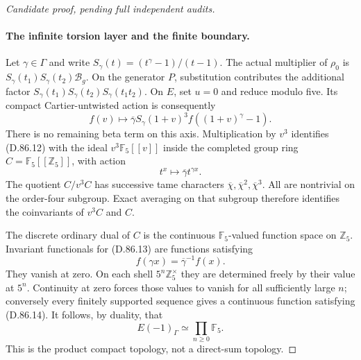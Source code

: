 \begin{proof}[Candidate proof, pending full independent audits]
\paragraph{The infinite torsion layer and the finite boundary.}
Let \(\gamma\in\Gamma\) and write
\(S_\gamma(t)=(t^\gamma-1)/(t-1)\). The actual multiplier
of \(\rho_0\) is
\(S_\gamma(t_1)S_\gamma(t_2)\mathcal B_g\).
On the generator \(P\), substitution contributes the additional
factor
\(S_\gamma(t_1)S_\gamma(t_2)S_\gamma(t_1t_2)\).
On \(E\), set \(u=0\) and reduce modulo five. Its compact
Cartier-untwisted action is consequently
\[
        f(v)\longmapsto
        \overline\gamma S_\gamma(1+v)^3
                   f((1+v)^\gamma-1).                \tag{D.86.12}
\]
There is no remaining beta term on this axis. Multiplication
by \(v^3\) identifies (D.86.12) with the ideal
\(v^3\mathbb F_5[[v]]\) inside the completed group ring
\(C=\mathbb F_5[[\mathbb Z_5]]\), with action
\[
                    t^x\longmapsto
                       \overline\gamma t^{\gamma x}.  \tag{D.86.13}
\]
The quotient \(C/v^3C\) has successive tame characters
\(\overline\chi,\overline\chi^2,\overline\chi^3\).
All are nontrivial on the order-four subgroup. Exact averaging
on that subgroup therefore identifies the coinvariants of
\(v^3C\) and \(C\).

The discrete ordinary dual of \(C\) is the continuous
\(\mathbb F_5\)-valued function space on \(\mathbb Z_5\).
Invariant functionals for (D.86.13) are functions satisfying
\[
 f(\gamma x)=\overline\gamma^{-1}f(x).
                                                               \tag{D.86.14}
\]
They vanish at zero. On each shell \(5^n\mathbb Z_5^\times\)
they are determined freely by their value at \(5^n\).
Continuity at zero forces those values to vanish for all
sufficiently large \(n\); conversely every finitely supported
sequence gives a continuous function satisfying (D.86.14).
It follows, by duality, that
\[
                         E(-1)_\Gamma
                               \simeq\prod_{n\ge0}\mathbb F_5.
                                                               \tag{D.86.15}
\]
This is the product compact topology, not a direct-sum topology.


\end{proof}

